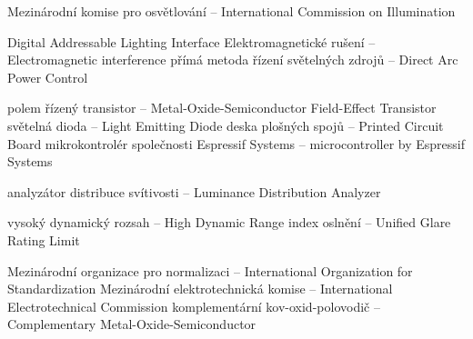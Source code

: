 


   {Mezinárodní komise pro osvětlování -- International Commission on Illumination}

  {Digital Addressable Lighting Interface}
  {Elektromagnetické rušení -- Electromagnetic interference}
 {přímá metoda řízení světelných zdrojů -- Direct Arc Power Control}

 {polem řízený transistor -- Metal-Oxide-Semiconductor Field-Effect Transistor}
    {světelná dioda -- Light Emitting Diode}
    {deska plošných spojů -- Printed Circuit Board}
  {mikrokontrolér společnosti Espressif Systems -- microcontroller by Espressif Systems}

    {analyzátor distribuce svítivosti -- Luminance Distribution Analyzer}

    {vysoký dynamický rozsah -- High Dynamic Range}
   {index oslnění -- Unified Glare Rating Limit}

    {Mezinárodní organizace pro normalizaci -- International Organization for Standardization}
    {Mezinárodní elektrotechnická komise -- International Electrotechnical Commission}
   {komplementární kov-oxid-polovodič -- Complementary Metal-Oxide-Semiconductor}

